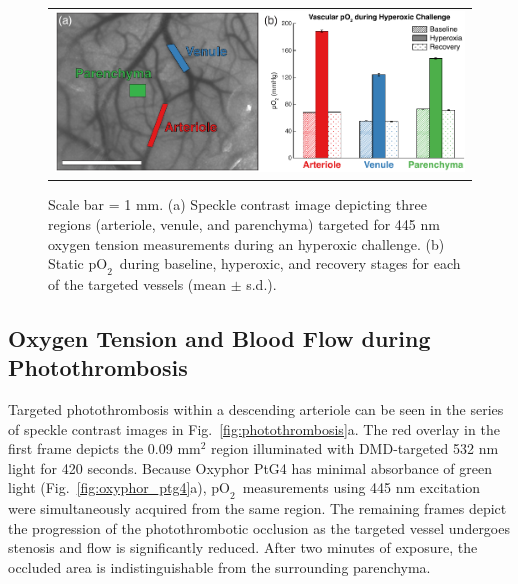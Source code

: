 \documentclass[12pt]{spieman}  %
\newcommand{\pO}{\ensuremath{\text{pO}_2}} 	            %
\begin{document}
\begin{spacing}{2}
\begin{figure}
    \begin{center}
        \begin{tabular}{c}
            \includegraphics[width=6.25in]{Figure4.pdf}
        \end{tabular}
    \end{center}
    \caption {
        \label{fig:hyperoxic_challenge}
        Scale bar = 1 mm. (a) Speckle contrast image depicting three regions (arteriole, venule, and parenchyma) targeted for 445 nm oxygen tension measurements during an hyperoxic challenge. (b) Static \pO\ during baseline, hyperoxic, and recovery stages for each of the targeted vessels (mean $\pm$ s.d.).
    }
\end{figure}


\subsection{Oxygen Tension and Blood Flow during Photothrombosis}
Targeted photothrombosis within a descending arteriole can be seen in the series of speckle contrast images in Fig.~\ref{fig:photothrombosis}a. The red overlay in the first frame depicts the 0.09 mm$^{2}$ region illuminated with DMD-targeted 532 nm light for 420 seconds. Because Oxyphor PtG4 has minimal absorbance of green light (Fig.~\ref{fig:oxyphor_ptg4}a), \pO\ measurements using 445 nm excitation were simultaneously acquired from the same region. The remaining frames depict the progression of the photothrombotic occlusion as the targeted vessel undergoes stenosis and flow is significantly reduced. After two minutes of exposure, the occluded area is indistinguishable from the surrounding parenchyma.


\end{spacing}
\end{document}

